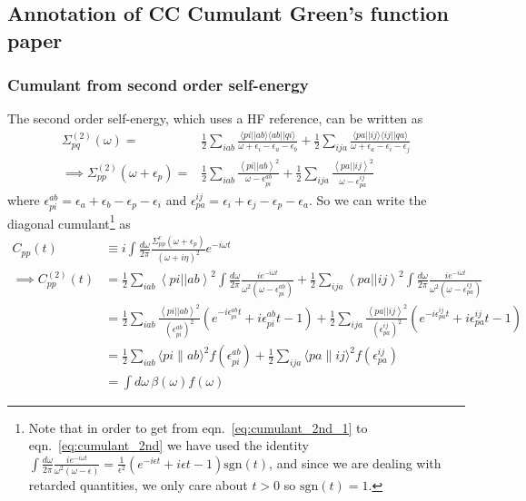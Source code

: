 \subsection{Annotation of CC Cumulant Green's function paper}
\subsubsection{Cumulant from second order self-energy}
The second order self-energy, which uses a HF reference, can be written as
\begin{align}
\Sigma_{pq}^{(2)}(\omega) =& \frac{1}{2} \sum_{iab} \frac{\langle pi || ab \rangle \langle ab || qi \rangle}{\omega + \epsilon_i - \epsilon_a - \epsilon_b} + \frac{1}{2} \sum_{ija} \frac{\langle pa || ij \rangle \langle ij || qa \rangle}{\omega + \epsilon_a - \epsilon_i - \epsilon_j} \\
\implies \Sigma_{pp}^{(2)}(\omega+\epsilon_p) =&
\frac{1}{2} \sum_{iab}
\frac{\left< pi \left| \right| ab \right>^2}
{\omega-\epsilon_{pi}^{ab}} + \frac{1}{2} \sum_{ija}
\frac{\left< pa \left| \right| ij \right>^2}
{\omega-\epsilon_{pa}^{ij}}
\end{align}
where
$\epsilon_{pi}^{ab} = \epsilon_{a}+\epsilon_{b}-\epsilon_{p}-\epsilon_{i}$
and
$\epsilon_{pa}^{ij} = \epsilon_{i}+\epsilon_{j}-\epsilon_{p}-\epsilon_{a}$. So we can write the diagonal cumulant\footnote{ 
Note that in order to get from eqn.~\ref{eq:cumulant_2nd_1} to eqn.~\ref{eq:cumulant_2nd} we have used the identity $\int \frac{d\omega}{2\pi} \frac{i e^{-i \omega t}}{\omega^2\left(\omega-\epsilon\right)} = \frac{1}{\epsilon^2} \left(e^{-i \epsilon t} +i \epsilon t -1 \right) \mathrm{sgn}(t)$, and since we are dealing with retarded quantities, we only care about $t>0$ so $\mathrm{sgn}(t) = 1$.} as
\begin{align}
C_{pp}(t) &\equiv i \int \frac{d\omega}{2\pi} \frac{ \Sigma_{pp}^c\left(\omega+\epsilon_p\right)}{(\omega + i \eta)^2} e^{-i \omega t} \\
\implies C_{pp}^{(2)}(t) &= \frac{1}{2} \sum_{iab} \left< pi \left| \right| ab \right>^2 \int \frac{d\omega}{2\pi} \frac{i e^{-i \omega t}}{\omega^2\left(\omega-\epsilon_{pi}^{ab}\right)} + \frac{1}{2} \sum_{ija} \left< pa \left| \right| ij \right>^2 \int \frac{d\omega}{2\pi} \frac{i e^{-i \omega t}}{\omega^2\left(\omega-\epsilon_{pa}^{ij}\right)} 
\label{eq:cumulant_2nd_1}
\\
&= \frac{1}{2}\sum_{iab} \frac{\left< pi \left| \right| ab \right>^2}{\left(\epsilon_{pi}^{ab}\right)^2}
\left(e^{-i \epsilon_{pi}^{ab} t} +i \epsilon_{pi}^{ab} t -1 \right)
+\frac{1}{2}\sum_{ija} \frac{\left< pa \left| \right| ij \right>^2}{\left(\epsilon_{pa}^{ij}\right)^2}
\left(e^{-i \epsilon_{pa}^{ij} t} +i \epsilon_{pa}^{ij} t -1 \right) 
\label{eq:cumulant_2nd}
\\
&= \frac{1}{2} \sum_{i a b}\langle p i \| a b\rangle^2 f\left(\epsilon_{p i}^{a b}\right)+\frac{1}{2} \sum_{i j a}\langle p a \| i j\rangle^2 f\left(\epsilon_{p a}^{i j}\right)\\
&= \int d\omega\, \beta(\omega) f(\omega)
\end{align}
